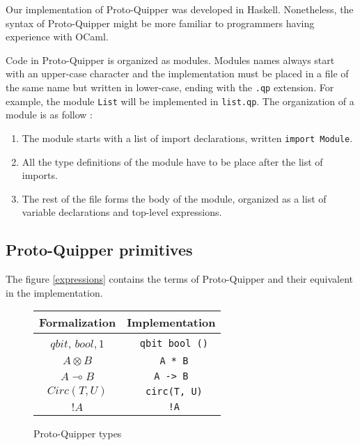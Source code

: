 

Our implementation of Proto-Quipper was developed in Haskell. 
Nonetheless, the syntax of Proto-Quipper might be more familiar 
to programmers having experience with OCaml.

Code in Proto-Quipper is organized as modules. Modules names 
always start with an upper-case character and the implementation 
must be placed in a file of the same name but written in lower-case, 
ending with the {\tt.qp} extension. For example, the module {\tt List} 
will be implemented in {\tt list.qp}.
The organization of a module is as follow :
	\begin{enumerate}
		\item The module starts with a list of import declarations, written {\tt import Module}.
		\item All the type definitions of the module have to be place after the list of imports.
		\item The rest of the file forms the body of the module, organized as a list of variable declarations and
			top-level expressions.
	\end{enumerate}

\subsection{Proto-Quipper primitives}

The figure \ref{expressions} contains the terms of Proto-Quipper and their equivalent in the implementation.

\begin{figure}[!ht]
\begin{center}
\begin{tabular}{|c|c|}
	\hline
	Formalization & Implementation \\\hline
	$qbit$, $bool, 1$ & \verb# qbit bool ()# \\\hline
	$A \otimes B$ & \verb# A * B# \\\hline
	$A \multimap B$ & \verb# A -> B # \\\hline
	$Circ(T, U)$ & \verb# circ(T, U)# \\\hline
	${!} A$ & \verb# !A# \\\hline
\end{tabular}
\end{center}
\label{types}
\caption{Proto-Quipper types}
\end{figure}

